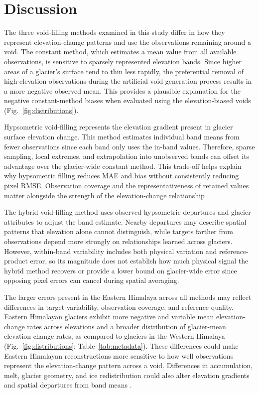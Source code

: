 \documentclass[tc,manuscript]{copernicus}
\begin{document}

\FloatBarrier


\section{Discussion}
The three void-filling methods examined in this study differ in how they represent elevation-change patterns and use the observations remaining around a void. The constant method, which estimates a mean value from all available observations, is sensitive to sparsely represented elevation bands. Since higher areas of a glacier's surface tend to thin less rapidly, the preferential removal of high-elevation observations during the artificial void generation process results in a more negative observed mean. This provides a plausible explanation for the negative constant-method biases when evaluated using the elevation-biased voids (Fig.~\ref{fig:distributions}).

Hypsometric void-filling represents the elevation gradient present in glacier surface elevation change. This method estimates individual band means from fewer observations since each band only uses the in-band values. Therefore, sparse sampling, local extremes, and extrapolation into unobserved bands can offset its advantage over the glacier-wide constant method. This trade-off helps explain why hypsometric filling reduces MAE and bias without consistently reducing pixel RMSE. Observation coverage and the representativeness of retained values matter alongside the strength of the elevation-change relationship \citep{mcnabb2019}.

The hybrid void-filling method uses observed hypsometric departures and glacier attributes to adjust the band estimate. Nearby departures may describe spatial patterns that elevation alone cannot distinguish, while targets farther from observations depend more strongly on relationships learned across glaciers. However, within-band variability includes both physical variation and reference-product error, so its magnitude does not establish how much physical signal the hybrid method recovers or provide a lower bound on glacier-wide error since opposing pixel errors can cancel during spatial averaging.

The larger errors present in the Eastern Himalaya across all methods may reflect differences in target variability, observation coverage, and reference quality. Eastern Himalayan glaciers exhibit more negative and variable mean elevation-change rates across elevations and a broader distribution of glacier-mean elevation change rates, as compared to glaciers in the Western Himalaya (Fig.~\ref{fig:distributions}; Table~\ref{tab:metadata}). These differences could make Eastern Himalayan reconstructions more sensitive to how well observations represent the elevation-change pattern across a void. Differences in accumulation, melt, glacier geometry, and ice redistribution could also alter elevation gradients and spatial departures from band means \citep{bolch2019, shean2020}.
\end{document}
